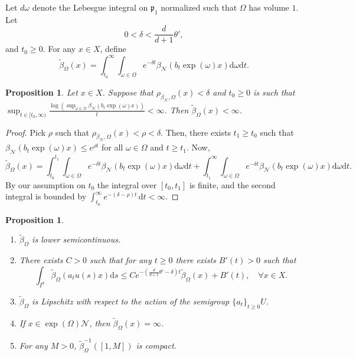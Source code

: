 \documentclass[12pt,reqno]{amsart}
\numberwithin{equation}{section}
\theoremstyle{plain}
\newtheorem{prop}[thm]{Proposition}
\theoremstyle{definition}
\theoremstyle{remark}
\newcommand\cN{\mathcal{N}}
\newcommand\fp{\mathfrak{p}}
\newcommand{\de}{\mathrm{d}}
\newcommand{\btt}{\widetilde{\beta}_\Omega}
\newcommand{\bN}{\beta_\cN}
\begin{document}
    Let $d\omega$ denote the Lebesgue integral on $\fp_1$ normalized such that $\Omega$ has volume $1$. Let 
    \begin{equation} \label{eq:delta}
        0<\delta<\frac{d}{d+1}\theta',
    \end{equation} and $t_0\geq 0$. For any $x\in X$, define
	\begin{equation} \label{eq:definition_beta_tilde}
	\btt(x)=\int_{t_0}^{\infty}\int_{\omega\in\Omega} e^{-\delta t}\bN(b_t \exp(\omega) x)\de\omega\de t.
	\end{equation}

    \begin{prop} \label{prop:btt-finite}
    Let $x\in X$. Suppose that $\rho_{\bN,\Omega}(x)<\delta$ and $t_0\geq 0$ is such that 
    $\sup_{t\in [t_0,\infty)}\frac{\log \left(\sup_{\omega\in\Omega}\bN(b_t\exp(\omega) x)\right)}{t}<\infty$. Then $\btt(x)<\infty$.
    \end{prop}

    \begin{proof} 
Pick $\rho$ such that $\rho_{\bN,\Omega}(x)<\rho<\delta$. Then, there exists $t_1\geq t_0$ such that $\bN(b_t\exp(\omega) x)\leq e^{\rho t}$ for all $\omega\in\Omega$ and $t\geq t_1$. Now,
\[
\btt(x) = \int_{t_0}^{t_1}\int_{\omega\in\Omega} e^{-\delta t}\bN(b_t\exp(\omega) x)\de\omega\de t + \int_{t_1}^\infty \int_{\omega\in\Omega} e^{-\delta t}\bN(b_t\exp(\omega) x)\de\omega\de t.
\]
By our assumption on $t_0$ the integral over $[t_0,t_1]$ is finite, and the second integral is bounded by
$\int_{t_0}^\infty e^{-(\delta-\rho)t}\,\de t < \infty$.
\end{proof}
    

	\begin{prop} \label{prop:properties of beta tilde}
		\begin{enumerate}
			\item \label{itm:bt-semicont} $\btt$ is lower semicontinuous.
			
			
            \item \label{itm:bt-contract} There exists $C>0$ such that for any $t\geq 0$ there exists $B'(t)>0$ such that 
            \begin{equation} \label{eq:btt-contract}
                 \int_{I^d}\btt(a_{t}u(s)x)\de s \leq Ce^{-(\frac{d}{d+1}\theta'-\delta)t}\btt(x)+B'(t), \quad \forall x\in X. 
            \end{equation}
            \item \label{itm:bt-lipschitz} $\btt$ is Lipschitz with respect to the action of the semigroup  
            $\{a_t\}_{t\geq 0}U$.
            \item \label{itm:bt-infinite} If $x\in \exp(\Omega)\cN$, then $\btt(x)=\infty$. 
            \item \label{itm:bt-proper}For any $M>0$, $\btt^{-1}([1,M])$ is compact.
            
            
		\end{enumerate}
	\end{prop}
\end{document}
